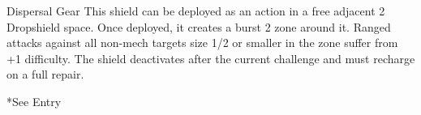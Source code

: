  Dispersal          Gear        This shield can be deployed as an action in a free adjacent          2
 Dropshield                     space. Once deployed, it creates a burst 2 zone around it.
                                Ranged attacks against all non-mech targets size 1/2 or smaller in
                                the zone suffer from +1 difficulty. The shield deactivates after the
                                current challenge and must recharge on a full repair.

*See Entry
